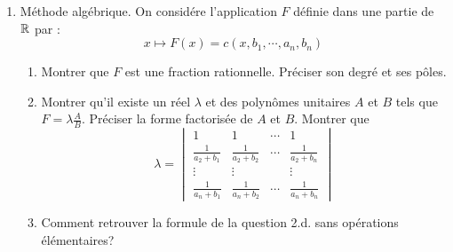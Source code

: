 \begin{enumerate}
\item Méthode algébrique.\newline
On considére l'application $F$ définie dans une partie de $\mathbb{R}$ par :
\begin{displaymath}
  x \mapsto F(x) = c(x,b_1,\cdots,a_{n},b_{n})
\end{displaymath}
\begin{enumerate}
  \item Montrer que $F$ est une fraction rationnelle. Préciser son degré et ses pôles.
  \item Montrer qu'il existe un réel $\lambda$ et des polynômes unitaires $A$ et $B$ tels que $F = \lambda \frac{A}{B}$. Préciser la forme factorisée de $A$ et $B$. Montrer que
\begin{displaymath}
  \lambda=
\begin{vmatrix}
  1                 & 1                  & \cdots & 1 \\
 \frac{1}{a_2 + b_1}& \frac{1}{a_2 + b_2}& \cdots &\frac{1}{a_2 + b_n} \\
 \vdots             &   \vdots           &        & \vdots             \\
 \frac{1}{a_n + b_1}& \frac{1}{a_n + b_2}& \cdots &\frac{1}{a_n + b_n}   
\end{vmatrix}
\end{displaymath}
  \item Comment retrouver la formule de la question 2.d. sans opérations élémentaires?
\end{enumerate}

\end{enumerate}
